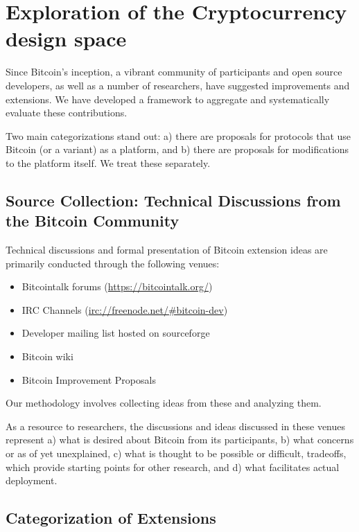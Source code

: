 \section{ Exploration of the Cryptocurrency design space }

Since Bitcoin's inception, a vibrant community of participants and open source developers, as well as a number of researchers, have suggested improvements and extensions. We have developed a framework to aggregate and systematically evaluate these contributions. 

Two main categorizations stand out: a) there are proposals for protocols that use Bitcoin (or a variant) as a platform, and b) there are proposals for modifications to the platform itself. We treat these separately.


\subsection{ Source Collection: Technical Discussions from the Bitcoin Community}
Technical discussions and formal presentation of Bitcoin extension ideas are primarily conducted through the following venues:
\begin{itemize}
\item Bitcointalk forums (\url{https://bitcointalk.org/})
\item IRC Channels (\url{irc://freenode.net/#bitcoin-dev})
\item Developer mailing list hosted on sourceforge
\item Bitcoin wiki
\item Bitcoin Improvement Proposals
\end{itemize}
Our methodology involves collecting ideas from these and analyzing them.

As a resource to researchers, the discussions and ideas discussed in these venues represent a) what is desired about Bitcoin from its participants, b) what concerns or as of yet unexplained, c) what is thought to be possible or difficult, tradeoffs, which provide starting points for other research, and d) what facilitates actual deployment.

\subsection{Categorization of Extensions}

